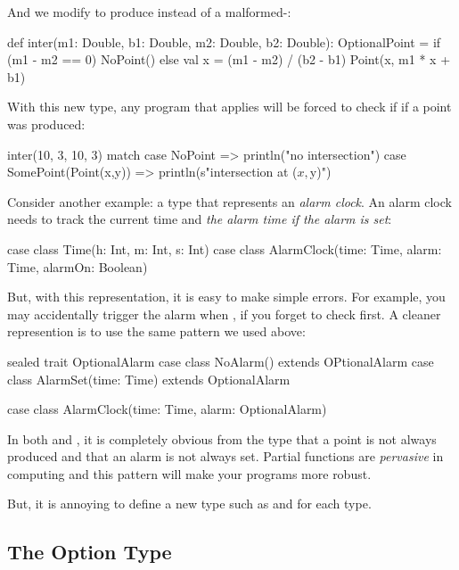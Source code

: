 \documentclass{book}
\begin{document}
And we modify  to produce  instead of a malformed-:

\begin{scalacode}
def inter(m1: Double, b1: Double, m2: Double, b2: Double): OptionalPoint = {
  if (m1 - m2 == 0) {
    NoPoint()
  }
  else {
    val x = (m1 - m2) / (b2 - b1)
    Point(x, m1 * x + b1)
  }
}
\end{scalacode}

With this new type, any program that applies  will be forced to check if
if a point was produced:

\begin{scalacode}
  inter(10, 3, 10, 3) match {
    case NoPoint => println("no intersection")
    case SomePoint(Point(x,y)) => println(s"intersection at ($x, $y)")
  }
\end{scalacode}

Consider another example: a type that represents an \emph{alarm clock}. An alarm
clock needs to track the current time and \emph{the alarm time if the alarm is set}:

\begin{scalacode}
case class Time(h: Int, m: Int, s: Int)
case class AlarmClock(time: Time, alarm: Time, alarmOn: Boolean)
\end{scalacode}

But, with this representation, it is easy to make simple errors. For example,
you may accidentally trigger the alarm when , if you forget
to check  first. A cleaner represention is to use the same pattern we used
above:

\begin{scalacode}
sealed trait OptionalAlarm
case class NoAlarm() extends OPtionalAlarm
case class AlarmSet(time: Time) extends OptionalAlarm

case class AlarmClock(time: Time, alarm: OptionalAlarm)
\end{scalacode}

In both  and , it is completely
obvious from the type that a point is not always produced and that an alarm is
not always set. Partial functions are \emph{pervasive} in computing and this pattern
will make your programs more robust.

But, it is annoying to define a new type such as 
and  for each type.

\subsection{The Option Type}
\end{document}
